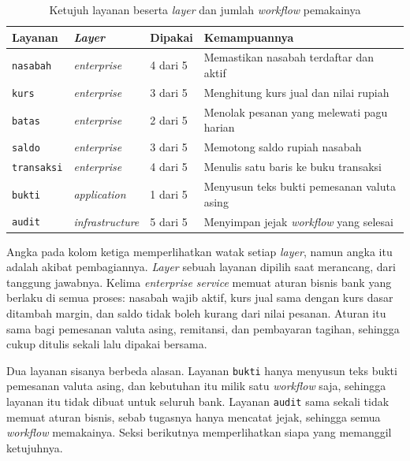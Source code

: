 \begin{table}[htbp]
  \centering
  \caption{Ketujuh layanan beserta \textit{layer} dan jumlah \textit{workflow} pemakainya}
  \label{tab:lapisan-layanan}
  \begin{tabularx}{\textwidth}{|l|l|l|X|}
    \hline
    \textbf{Layanan} & \textbf{\textit{Layer}} & \textbf{Dipakai} & \textbf{Kemampuannya} \\
    \hline
    \texttt{nasabah} & \textit{enterprise} & 4 dari 5 & Memastikan nasabah terdaftar dan aktif \\
    \hline
    \texttt{kurs} & \textit{enterprise} & 3 dari 5 & Menghitung kurs jual dan nilai rupiah \\
    \hline
    \texttt{batas} & \textit{enterprise} & 2 dari 5 & Menolak pesanan yang melewati pagu harian \\
    \hline
    \texttt{saldo} & \textit{enterprise} & 3 dari 5 & Memotong saldo rupiah nasabah \\
    \hline
    \texttt{transaksi} & \textit{enterprise} & 4 dari 5 & Menulis satu baris ke buku transaksi \\
    \hline
    \texttt{bukti} & \textit{application} & 1 dari 5 & Menyusun teks bukti pemesanan valuta asing \\
    \hline
    \texttt{audit} & \textit{infrastructure} & 5 dari 5 & Menyimpan jejak \textit{workflow} yang selesai \\
    \hline
  \end{tabularx}
\end{table}

Angka pada kolom ketiga memperlihatkan watak setiap \textit{layer}, namun
angka itu adalah akibat pembagiannya. \textit{Layer} sebuah layanan dipilih saat
merancang, dari tanggung jawabnya. Kelima \textit{enterprise service} memuat
aturan bisnis bank yang berlaku di semua proses: nasabah wajib aktif, kurs jual
sama dengan kurs dasar ditambah margin, dan saldo tidak boleh kurang dari nilai
pesanan. Aturan itu sama bagi pemesanan valuta asing, remitansi, dan
pembayaran tagihan, sehingga cukup ditulis sekali lalu dipakai bersama.

Dua layanan sisanya berbeda alasan. Layanan \texttt{bukti} hanya menyusun teks
bukti pemesanan valuta asing, dan kebutuhan itu milik satu \textit{workflow}
saja, sehingga layanan itu tidak dibuat untuk seluruh bank. Layanan
\texttt{audit} sama sekali tidak memuat aturan bisnis, sebab tugasnya hanya
mencatat jejak, sehingga semua \textit{workflow} memakainya. Seksi berikutnya
memperlihatkan siapa yang memanggil ketujuhnya.

